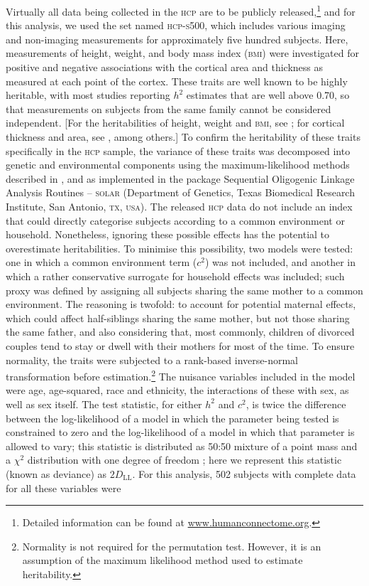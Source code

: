Virtually all data being collected in the \textsc{hcp} are to be publicly released,\footnote{Detailed information can be found at \href{http://www.humanconnectome.org}{www.humanconnectome.org}.} and for this analysis, we used the set named \textsc{hcp-s500}, which includes various imaging and non-imaging measurements for approximately five hundred subjects. Here, measurements of height, weight, and body mass index (\textsc{bmi}) \citep{Barch2013} were investigated for positive and negative associations with the cortical area and thickness as measured at each point of the cortex. These traits are well known to be highly heritable, with most studies reporting $h^2$ estimates that are well above 0.70, so that measurements on subjects from the same family cannot be considered independent. [For the heritabilities of height, weight and \textsc{bmi}, see \citet{Farooqi2005, Visscher2006, Walley2006, Silventoinen2009, Silventoinen2012, Min2013}; for cortical thickness and area, see \citet{Panizzon2009, Winkler2010, Joshi2011, Eyler2011, Eyler2012, Kremen2013, McKay2014}, among others.] To confirm the heritability of these traits specifically in the \textsc{hcp} sample, the variance of these traits was decomposed into genetic and environmental components using the maximum-likelihood methods described in \citet{Almasy1998}, and as implemented in the package Sequential Oligogenic Linkage Analysis Routines -- \textsc{solar} (Department of Genetics, Texas Biomedical Research Institute, San Antonio, \textsc{tx}, \textsc{usa}). The released \textsc{hcp} data do not include an index that could directly categorise subjects according to a common environment or household. Nonetheless, ignoring these possible effects has the potential to overestimate heritabilities. To minimise this possibility, two models were tested: one in which a common environment term ($c^2$) was not included, and another in which a rather conservative surrogate for household effects was included; such proxy was defined by assigning all subjects sharing the same mother to a common environment. The reasoning is twofold: to account for potential maternal effects, which could affect half-siblings sharing the same mother, but not those sharing the same father, and also considering that, most commonly, children of divorced couples tend to stay or dwell with their mothers for most of the time. To ensure normality, the traits were subjected to a rank-based inverse-normal transformation before estimation.\footnote{Normality is not required for the permutation test. However, it is an assumption of the maximum likelihood method used to estimate heritability.} The nuisance variables included in the model were age, age-squared, race and ethnicity, the interactions of these with sex, as well as sex itself. The test statistic, for either $h^2$ and $c^2$, is twice the difference between the log-likelihood of a model in which the parameter being tested is constrained to zero and the log-likelihood of a model in which that parameter is allowed to vary; this statistic is distributed as 50:50 mixture of a point mass and a $\chi^2$ distribution with one degree of freedom \citep{Self1987}; here we represent this statistic (known as deviance) as $2D_{\text{LL}}$. For this analysis, 502 subjects with complete data for all these variables were 